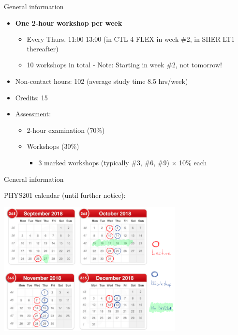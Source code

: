 \begin{frame}{General information}
\begin{itemize}
\item {\bf One 2-hour workshop per week}
   \begin{itemize}
       \item Every Thurs. 11:00-13:00 (in CTL-4-FLEX in week \#2, in SHER-LT1 thereafter)
       \item 10 workshops in total - {\color{red} Note: Starting in week \#2, not tomorrow!}
   \end{itemize}
\item Non-contact hours: 102 (average study time 8.5 hrs/week)
\item Credits: 15
\item Assessment:
   \begin{itemize}
      \item 2-hour examination (70\%)
      \item Workshops (30\%)
          \begin{itemize}
                \item 3 marked workshops (typically \#3, \#6, \#9) $\times$ 10\% each
          \end{itemize}
   \end{itemize}
\end{itemize}

\end{frame}


%
%
%

\begin{frame}{General information}

PHYS201 calendar (until further notice):\\
  \begin{center}
    \includegraphics[width=0.7\textwidth]{./images/year_specific/calendar_v1.png}\\
  \end{center}

\end{frame}


